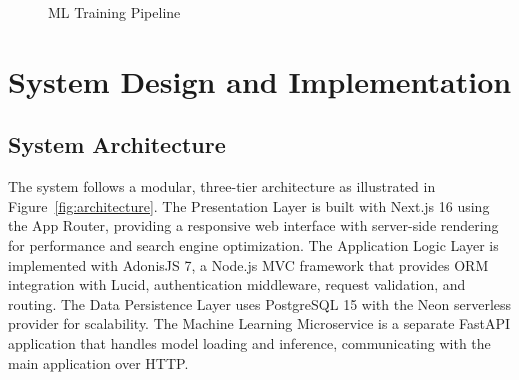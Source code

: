 \documentclass[12pt,a4paper,oneside]{report}
\begin{document}
\begin{figure}[H]
\centering
{}
\caption{ML Training Pipeline}
\label{fig:ml-pipeline}
\end{figure}

\section{System Design and Implementation}
\subsection{System Architecture}
The system follows a modular, three-tier architecture as illustrated in Figure~\ref{fig:architecture}. The Presentation Layer is built with Next.js 16 using the App Router, providing a responsive web interface with server-side rendering for performance and search engine optimization. The Application Logic Layer is implemented with AdonisJS 7, a Node.js MVC framework that provides ORM integration with Lucid, authentication middleware, request validation, and routing. The Data Persistence Layer uses PostgreSQL 15 with the Neon serverless provider for scalability. The Machine Learning Microservice is a separate FastAPI application that handles model loading and inference, communicating with the main application over HTTP.
\end{document}
